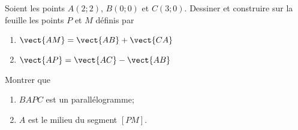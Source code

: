 
\begin{exercice}[\ldots/4]\label{exosmath-0701}

\begin{wrapfigure}{r}{8.0cm}
   \vspace{-1cm}        %
   \centering
   
\end{wrapfigure}

    Soient les points \( A(2;2)\), \( B(0;0)\) et \( C(3;0)\). Dessiner et construire sur la feuille les points \( P\) et \( M\) définis par
    \begin{enumerate}
        \item
            $\vect{ AM }=\vect{ AB }+\vect{ CA }$
        \item
            $\vect{ AP }=\vect{ AC }-\vect{ AB }$
    \end{enumerate}
    Montrer que
    \begin{enumerate}
        \item
            \( BAPC\) est un parallélogramme;
        \item
            \( A\) est le milieu du segment \( [PM]\).
    \end{enumerate}


\end{exercice}
